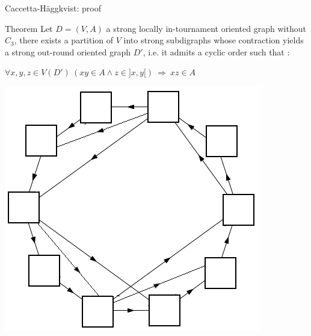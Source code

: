 \documentclass{beamer}
\newcommand{\Hag}{H\"aggkvist\xspace}
\newcommand{\Ra}{\Rightarrow}
\newcommand{\ovlra}{\overleftrightarrow}
\DeclareMathOperator{\Forb}{Forb}
\newcommand{\F}[1]{\Forb{#1}}
\begin{document}
\begin{frame}{Caccetta-\Hag : proof}

\begin{block}{Theorem}
Let $D = (V,A)$ a strong locally in-tournament oriented graph without $C_3$, 
there exists a partition of $V$ into strong
subdigraphs whose contraction yields a strong out-round oriented graph $D'$,
 i.e. it admits a cyclic order such that :

$\forall x,y,z\in V(D')\  (xy\in A \land  z\in ]x,y[  )\ \Ra\ xz\in A
$
\end{block}

\centering

\includegraphics[scale=0.4]{Images/decomposition_reversed.png}
\end{frame}
\end{document}
